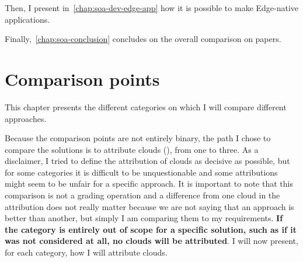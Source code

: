 Then, I present in~\autoref{chap:soa-dev-edge-app} how it is possible
to make Edge-native applications.
%
%

Finally,~\autoref{chap:soa-conclusion} concludes on the overall
comparison on papers.


\chapter{Comparison points}
\label{chap:comparison}

This chapter presents the different categories on which I will
compare different approaches.

Because the comparison points are not entirely binary, the path I
chose to compare the solutions is to attribute clouds (\cloud), from
one to three.
%
As a disclaimer, I tried to define the attribution of clouds as
decisive as possible, but for some categories it is difficult to be
unquestionable and some attributions might seem to be unfair for a
specific approach.
%
It is important to note that this comparison is not a grading
operation and a difference from one cloud in the attribution does not
really matter because we are not saying that an approach is better
than another, but simply I am comparing them to my requirements.
%
\textbf{If the category is entirely out of scope for a specific
  solution, such as if it was not considered at all, no clouds will be
  attributed}.
%
I will now present, for each category, how I will attribute clouds.


